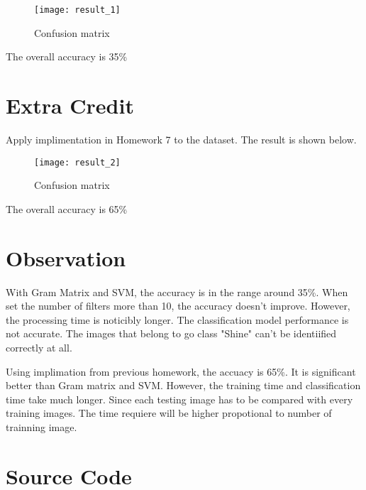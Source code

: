 \documentclass[11pt]{article}
\begin{document}
\begin{figure}[H]
\centering
\texttt{[image: result\_1]}
\caption{Confusion matrix}
\label{}
\end{figure}

The overall accuracy is 35\%


\section*{Extra Credit}

Apply implimentation in Homework 7 to the dataset. The result is shown below.

\begin{figure}[H]
\centering
\texttt{[image: result\_2]}
\caption{Confusion matrix}
\label{}
\end{figure}

The overall accuracy is 65\%


\section*{Observation}

With Gram Matrix and SVM, the accuracy is in the range around 35\%. When set the number of filters more than 10, the accuracy doesn't improve. However, the processing time is noticibly longer. The classification model performance is not accurate. The images that belong to go class "Shine" can't be identiified correctly at all. 

Using implimation from previous homework, the accuacy is 65\%. It is significant better than Gram matrix and SVM. However, the training time and classification time take much longer. Since each testing image has to be compared with every training images. The time requiere will be higher propotional to number of trainning image.



\section*{Source Code}
\end{document}
